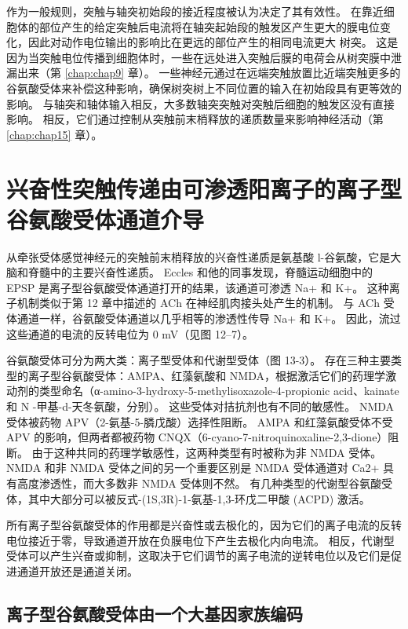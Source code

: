 作为一般规则，突触与轴突初始段的接近程度被认为决定了其有效性。 
在靠近细胞体的部位产生的给定突触后电流将在轴突起始段的触发区产生更大的膜电位变化，因此对动作电位输出的影响比在更远的部位产生的相同电流更大 树突。 
这是因为当突触电位传播到细胞体时，一些在远处进入突触后膜的电荷会从树突膜中泄漏出来（第 \ref{chap:chap9} 章）。 
一些神经元通过在远端突触放置比近端突触更多的谷氨酸受体来补偿这种影响，确保树突树上不同位置的输入在初始段具有更等效的影响。 
与轴突和轴体输入相反，大多数轴突突触对突触后细胞的触发区没有直接影响。 
相反，它们通过控制从突触前末梢释放的递质数量来影响神经活动（第 \ref{chap:chap15} 章）。



\section{兴奋性突触传递由可渗透阳离子的离子型谷氨酸受体通道介导}

从牵张受体感觉神经元的突触前末梢释放的兴奋性递质是氨基酸 l-谷氨酸，它是大脑和脊髓中的主要兴奋性递质。 
Eccles 和他的同事发现，脊髓运动细胞中的 EPSP 是离子型谷氨酸受体通道打开的结果，该通道可渗透 Na+ 和 K+。 
这种离子机制类似于第 12 章中描述的 ACh 在神经肌肉接头处产生的机制。
与 ACh 受体通道一样，谷氨酸受体通道以几乎相等的渗透性传导 Na+ 和 K+。 因此，流过这些通道的电流的反转电位为 0 mV（见图 12–7）。


谷氨酸受体可分为两大类：离子型受体和代谢型受体（图 13-3）。 
存在三种主要类型的离子型谷氨酸受体：AMPA、红藻氨酸和 NMDA，根据激活它们的药理学激动剂的类型命名（α-amino-3-hydroxy-5-methylisoxazole-4-propionic acid、kainate 和 N -甲基-d-天冬氨酸，分别）。
这些受体对拮抗剂也有不同的敏感性。 NMDA 受体被药物 APV（2-氨基-5-膦戊酸）选择性阻断。 
AMPA 和红藻氨酸受体不受 APV 的影响，但两者都被药物 CNQX（6-cyano-7-nitroquinoxaline-2,3-dione）阻断。 
由于这种共同的药理学敏感性，这两种类型有时被称为非 NMDA 受体。 
NMDA 和非 NMDA 受体之间的另一个重要区别是 NMDA 受体通道对 Ca2+ 具有高度渗透性，而大多数非 NMDA 受体则不然。 
有几种类型的代谢型谷氨酸受体，其中大部分可以被反式-(1S,3R)-1-氨基-1,3-环戊二甲酸 (ACPD) 激活。


所有离子型谷氨酸受体的作用都是兴奋性或去极化的，因为它们的离子电流的反转电位接近于零，导致通道开放在负膜电位下产生去极化内向电流。
相反，代谢型受体可以产生兴奋或抑制，这取决于它们调节的离子电流的逆转电位以及它们是促进通道开放还是通道关闭。



\subsection{离子型谷氨酸受体由一个大基因家族编码}

